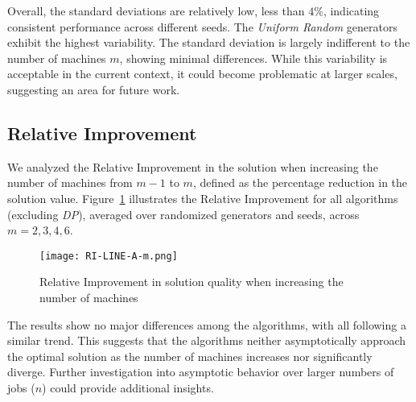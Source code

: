 Overall, the standard deviations are relatively low, less than $4\%$, indicating consistent performance across different seeds. The \textit{Uniform Random} generators exhibit the highest variability. The standard deviation is largely indifferent to the number of machines $m$, showing minimal differences. While this variability is acceptable in the current context, it could become problematic at larger scales, suggesting an area for future work.

\subsection{Relative Improvement}

We analyzed the Relative Improvement in the solution when increasing the number of machines from $m-1$ to $m$, defined as the percentage reduction in the solution value. Figure~\ref{fig:RI-LINE-A-m} illustrates the Relative Improvement for all algorithms (excluding \textit{DP}), averaged over randomized generators and seeds, across $m = 2, 3, 4, 6$.

\begin{figure}
    \centering
    \texttt{[image: RI-LINE-A-m.png]}
    \caption{Relative Improvement in solution quality when increasing the number of machines}
    \label{fig:RI-LINE-A-m}
\end{figure}

The results show no major differences among the algorithms, with all following a similar trend. This suggests that the algorithms neither asymptotically approach the optimal solution as the number of machines increases nor significantly diverge. Further investigation into asymptotic behavior over larger numbers of jobs ($n$) could provide additional insights.